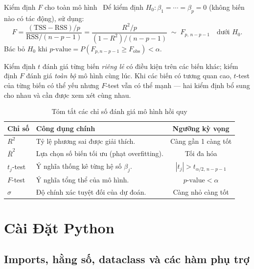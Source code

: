 \begin{mythm}{Kiểm định $F$ cho toàn mô hình}{}~\cite{wooldridge2013,james2013}
Để kiểm định $H_0 : \beta_1 = \cdots = \beta_p = 0$ (không biến nào có tác động),
sử dụng:
\[
    F = \frac{(\mathrm{TSS} - \mathrm{RSS})/p}{\mathrm{RSS}/(n - p - 1)}
    = \frac{R^2/p}{(1 - R^2)/(n - p - 1)}
    \;\sim\; F_{p,\,n-p-1}
    \quad \text{dưới } H_0.
\]
Bác bỏ $H_0$ khi $p\text{-value} = P(F_{p,n-p-1} \geq F_{\mathrm{obs}}) < \alpha$.
\end{mythm}

\begin{note}
Kiểm định $t$ đánh giá từng biến \emph{riêng lẻ} có điều kiện trên các biến khác;
kiểm định $F$ đánh giá \emph{toàn bộ} mô hình cùng lúc. Khi các biến có tương quan
cao, $t$-test của từng biến có thể yếu nhưng $F$-test vẫn có thể mạnh — hai kiểm
định bổ sung cho nhau và cần được xem xét cùng nhau.
\end{note}

\begin{table}[H]
\centering
\caption{Tóm tắt các chỉ số đánh giá mô hình hồi quy}
\label{tab:model_metrics}
\begin{tabular}{llc}
\toprule
\textbf{Chỉ số} & \textbf{Công dụng chính} & \textbf{Ngưỡng kỳ vọng} \\ \midrule
$R^2$
    & Tỷ lệ phương sai được giải thích.
    & Càng gần 1 càng tốt \\
$\bar{R}^2$
    & Lựa chọn số biến tối ưu (phạt overfitting).
    & Tối đa hóa \\
$t_j$-test
    & Ý nghĩa thống kê từng hệ số $\beta_j$.
    & $|t_j| > t_{\alpha/2,\,n-p-1}$ \\
$F$-test
    & Ý nghĩa tổng thể của mô hình.
    & $p\text{-value} < \alpha$ \\
$\hat{\sigma}$
    & Độ chính xác tuyệt đối của dự đoán.
    & Càng nhỏ càng tốt \\ \bottomrule
\end{tabular}
\end{table}

\section{Cài Đặt Python}

\subsection{Imports, hằng số, dataclass và các hàm phụ trợ}

